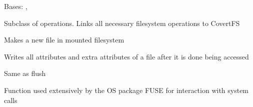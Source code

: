 \documentclass[letterpaper,12pt,openany,oneside]{sphinxmanual}
\begin{document}
\begin{fulllineitems}
\label{File_System:webStegFS.File_System.memfuse.MemFS}
Bases: , 

Subclass of operations. Links all necessary filesystem operations to CovertFS

\begin{fulllineitems}
\label{File_System:webStegFS.File_System.memfuse.MemFS.create}
Makes a new file in mounted filesystem

\end{fulllineitems}


\begin{fulllineitems}
\label{File_System:webStegFS.File_System.memfuse.MemFS.flush}
Writes all attributes and extra attributes of a file after it is done being accessed

\end{fulllineitems}


\begin{fulllineitems}
\label{File_System:webStegFS.File_System.memfuse.MemFS.fsync}
Same as flush

\end{fulllineitems}


\begin{fulllineitems}
\label{File_System:webStegFS.File_System.memfuse.MemFS.getattr}
Function used extensively by the OS package FUSE for interaction with system calls

\end{fulllineitems}



\end{fulllineitems}
\end{document}
